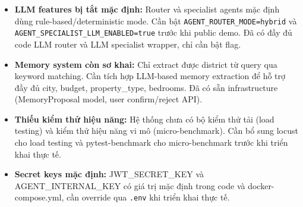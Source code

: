 \begin{itemize}
    \item \textbf{LLM features bị tắt mặc định:} Router và specialist agents mặc định dùng rule-based/deterministic mode. Cần bật \texttt{AGENT\_ROUTER\_MODE=hybrid} và \texttt{AGENT\_SPECIALIST\_LLM\_ENABLED=true} trước khi public demo. Đã có đầy đủ code LLM router và LLM specialist wrapper, chỉ cần bật flag.

    \item \textbf{Memory system còn sơ khai:} Chỉ extract được district từ query qua keyword matching. Cần tích hợp LLM-based memory extraction để hỗ trợ đầy đủ city, budget, property\_type, bedrooms. Đã có sẵn infrastructure (MemoryProposal model, user confirm/reject API).

    \item \textbf{Thiếu kiểm thử hiệu năng:} Hệ thống chưa có bộ kiểm thử tải (load testing) và kiểm thử hiệu năng vi mô (micro-benchmark). Cần bổ sung locust cho load testing và pytest-benchmark cho micro-benchmark trước khi triển khai thực tế.

    \item \textbf{Secret keys mặc định:} JWT\_SECRET\_KEY và AGENT\_INTERNAL\_KEY có giá trị mặc định trong code và docker-compose.yml, cần override qua \texttt{.env} khi triển khai thực tế.
\end{itemize}

\newpage
